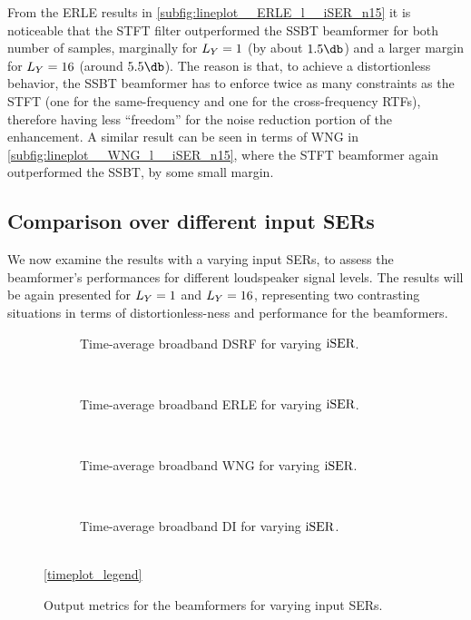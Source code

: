 From the ERLE results in \cref{subfig:lineplot__ERLE_l__iSER_n15} it is noticeable that the STFT filter outperformed the SSBT beamformer for both number of samples, marginally for $\Ly = 1$ (by about $1.5\dB$) and a larger margin for $\Ly = 16$ (around $5.5 \dB$). The reason is that, to achieve a distortionless behavior, the SSBT beamformer has to enforce twice as many constraints as the STFT (one for the same-frequency and one for the cross-frequency RTFs), therefore having less ``freedom'' for the noise reduction portion of the enhancement. A similar result can be seen in terms of WNG in \cref{subfig:lineplot__WNG_l__iSER_n15}, where the STFT beamformer again outperformed the SSBT, by some small margin.

\subsection{Comparison over different input SERs}

We now examine the results with a varying input SERs, to assess the beamformer's performances for different loudspeaker signal levels. The results will be again presented for $\Ly = 1$ and $\Ly = 16$, representing two contrasting situations in terms of distortionless-ness and performance for the beamformers.


\begin{figure}[!t]
	\centering
	\begin{subfigure}{\textwidth}
		\centering
		
		\caption{Time-average broadband DSRF for varying $\text{iSER}$.}
		\label{subfig:lineplot__DSRF__iSER_var}
	\end{subfigure}\\[1em]
	\begin{subfigure}{\textwidth}
		\centering
		
		\caption{Time-average broadband ERLE for varying $\text{iSER}$.}
		\label{subfig:lineplot__ERLE__iSER_var}
	\end{subfigure}\\[1em]
	\begin{subfigure}{\textwidth}
		\centering
		
		\caption{Time-average broadband WNG for varying $\text{iSER}$.}
		\label{subfig:lineplot__WNG__iSER_var}
	\end{subfigure}\\[1em]
	\begin{subfigure}{\textwidth}
		\centering
		
		\caption{Time-average broadband DI for varying $\text{iSER}$.}
		\label{subfig:lineplot__DI__iSER_var}
	\end{subfigure}\\[1em]
	\ref*{timeplot_legend}
	\caption{Output metrics for the beamformers for varying input SERs.}
	\label{fig:lineplot__iSER_var__Ly_1}
\end{figure}

